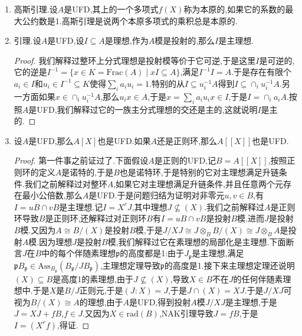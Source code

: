 \begin{enumerate}
\begin{proof}
    	投射模是一个局部性质,任取$A$的极大理想$\mathfrak{m}$,我们有$(uA\cap vA)_{\mathfrak{m}}=uA_{\mathfrak{m}}\cap vA_{\mathfrak{m}}$.由于$A_{\mathfrak{m}}$是正则局部环,它是UFD,于是两个元的最小公倍数总存在,也即$uA_{\mathfrak{m}}\cap vA_{\mathfrak{m}}$是主理想,于是它是自由$A_{\mathfrak{m}}$模,于是$uA\cap vA$是投射$A$模.
    \end{proof}
    \item 高斯引理.设$A$是UFD,其上的一个多项式$f(X)$称为本原的,如果它的系数的最大公约数是1.高斯引理是说两个本原多项式的乘积总是本原的.
    \item 引理.设$A$是UFD,设$I\subseteq A$是理想,作为$A$模是投射的,那么$I$是主理想.
    \begin{proof}
    	
    	我们解释过整环上分式理想是投射模等价于它可逆,于是这里$I$是可逆的,它的逆是$I^{-1}=\{x\in K=\mathrm{Frac}(A)\mid xI\subseteq A\}$,满足$I^{-1}I=A$.于是存在有限个$a_i\in I$和$u_i\in I^{-1}\subseteq K$使得$\sum_ia_iu_i=1$.特别的从$I\subseteq u_i^{-1}A$得到$I\subseteq\cap_iu_i^{-1}A$.另一方面如果$x\in\cap_iu_i^{-1}A$,那么$u_ix\in A$,于是$x=\sum_ia_iu_ix\in I$,于是$I=\cap_ia_iA$.按照$A$是UFD,我们解释过它的一族主分式理想的交还是主的,这就说明$I$是主的.
    \end{proof}
    \item 设$A$是UFD,那么$A[X]$也是UFD.如果$A$还是正则环,那么$A[[X]]$也是UFD.
    \begin{proof}
    	
    	第一件事之前证过了.下面假设$A$是正则的UFD,记$B=A[[X]]$,按照正则环的定义$A$是诺特的,于是$B$也是诺特环,于是特别的它对主理想满足升链条件.我们之前解释过对整环$A$,如果它对主理想满足升链条件,并且任意两个元存在最小公倍数,那么$A$是UFD.于是问题归结为证明对非零元$u,v\in B$,有$I=uB\cap vB$是主理想.记$I=X^rJ$,其中理想$J\not\subseteq(X)$.我们之前解释过$A$是正则环导致$B$是正则环,还解释过对正则环$B$有$I=uB\cap vB$是投射$B$模.进而$J$是投射$B$模.又因为$A\cong B/(X)$是投射$B$模,于是$J/XJ\cong J\otimes_BB/(X)\cong J\otimes_BA$是投射$A$模.因为理想$J$是投射$B$模,我们解释过它在素理想的局部化是主理想.下面断言$J$在$B$中的每个伴随素理想$\mathfrak{p}$的高度都是1:由于$J_{\mathfrak{p}}$是主理想,满足$\mathfrak{p}B_{\mathfrak{p}}\in\mathrm{Ass}_{B_{\mathfrak{p}}}(B_{\mathfrak{p}}/JB_{\mathfrak{p}})$,主理想定理导致$\mathfrak{p}$的高度是1.接下来主理想定理还说明$(X)\subseteq B$是高度1的素理想,由于$J\not\subseteq(X)$,导致$X\in B$不在$J$的任何伴随素理想中.于是$X$是$B/J$正则元,于是$(J:X)=J$,于是$J\cap(X)=XJ$.于是$J/XJ$可视为$B/(X)\cong A$的理想,由于$A$是UFD,得到投射$A$模$J/XJ$是主理想,于是$J=XJ+fB$,$f\in J$.又因为$X\in\mathrm{rad}(B)$,NAK引理导致$J=fB$,于是$I=(X^rf)$,得证.
    \end{proof}
\end{enumerate}

